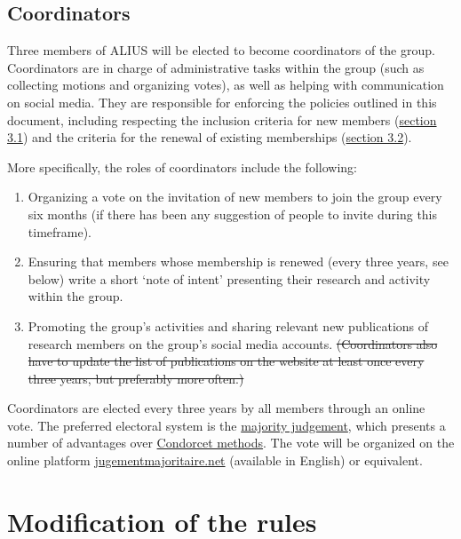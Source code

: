 \documentclass[a4paper, 11pt]{scrartcl}
\begin{document}
\subsection{Coordinators}
\label{coordinators}

Three members of ALIUS will be elected to become coordinators of the group. Coordinators are in charge of administrative tasks within the group (such as collecting motions and organizing votes), as well as helping with communication on social media. They are responsible for enforcing the policies outlined in this document, including respecting the inclusion criteria for new members (\hyperref[new_memberships]{section 3.1}) and the criteria for the renewal of existing memberships (\hyperref[membership_renewal]{section 3.2}).

More specifically, the roles of coordinators include the following:

\begin{enumerate}

\item Organizing a vote on the invitation of new members to join the group every six months (if there has been any suggestion of people to invite during this timeframe).
\item Ensuring that members whose membership is renewed (every three years, see below) write a short `note of intent' presenting their research and activity within the group.
\item Promoting the group's activities and sharing relevant new publications of research members on the group's social media accounts. \sout{(Coordinators also have to update the list of publications on the website at least once every three years, but preferably more often.)}

\end{enumerate}

\noindent Coordinators are elected every three years by all members through an online vote. The preferred electoral system is the \href{https://en.wikipedia.org/wiki/Majority_judgment}{majority judgement}, which presents a number of advantages over \href{https://en.wikipedia.org/wiki/Condorcet_method}{Condorcet methods}. The vote will be organized on the online platform \href{https://jugementmajoritaire.net/}{jugementmajoritaire.net} (available in English) or equivalent.

\section{Modification of the rules}
\label{modif}
\end{document}
